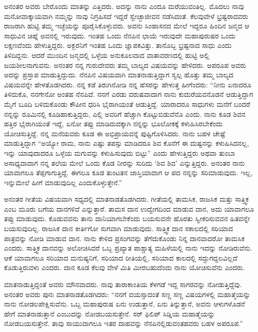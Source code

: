  ಅನಂತರ ಅವರು ಬೇರೊಂದು ಮಾತನ್ನು ಎತ್ತಿದರು. ಅದನ್ನು ನಾನು ಎಂದೂ ಮರೆಯುವಂತಿಲ್ಲ. ಮೊದಲು ನಾವು ಮನೋವಾಕ್ಕಾಯವಾಗಿ ನಮ್ಮನ್ನು ನಾವು ನಿಗ್ರಹಿಸದೆ ಇದ್ದರೆ ಸ್ವೇಚ್ಛಾಜೀವನ ನಡೆಸಿದಂತೆ. ಕೆಲವುವೇಳೆ ಭ್ರಷ್ಟರಾದವರು ರಾಜರಾಗಿ ಹುಟ್ಟಿ ತಮ್ಮ ಇಚ್ಛೆಯನ್ನು ಪೂರೈಸಿಕೊಳ್ಳುವರು. ಅವನು ಸಿಂಹಾಸನದ ಮೇಲೆ ಇದ್ದರೂ ಹಿಂದಿನ ಜನ್ಮದ ಆ ಸಾಧುವಿನ ಚಿಹ್ನೆ ಅವನಲ್ಲಿ ಇರುವುದು. ಇಂತಹ ಒಂದು ನೆನಪಿನ ಛಾಯೆ ಇರುವುದೇ ಮಹಾಪುರುಷರ ಒಂದು ಲಕ್ಷಣವೆಂದು ಹೇಳುತ್ತಿದ್ದರು. ಅಕ್ಬರನಿಗೆ ಇಂತಹ ಒಂದು ಜ್ಞಾಪಕವಿತ್ತು. ತಾನೊಬ್ಬ ಭ್ರಷ್ಟನಾದ ಸಾಧು ಎಂದು ತಿಳಿದಿದ್ದನು. ಆದರೆ ಮುಂದಿನ ಜನ್ಮದಲ್ಲಿ ಒಳ್ಳೆಯ ಅನುಕೂಲವಾದ ವಾತಾವರಣದಲ್ಲಿ ಹುಟ್ಟಿ ಅಲ್ಲಿ ಜಯಶೀಲನಾಗುವನು. ಅನಂತರ ನನ್ನ ಗುರುದೇವರು ತಮ್ಮ ಬಾಲ್ಯದ ವಿಷಯವನ್ನು ಹೇಳಿದರು. ಅಪರೂಪ ಅವರು ಅದನ್ನು ಪ್ರಸ್ತಾಪ ಮಾಡುತ್ತಿದ್ದುದು. ನೆನಪಿನ ವಿಷಯವಾಗಿ ಮಾತನಾಡುತ್ತಿದ್ದಾಗ ಸ್ವಲ್ಪ ಹೊತ್ತು ತಮ್ಮ ಬಾಲ್ಯದ ವಿಷಯವನ್ನೇ ಹೇಳತೊಡಗಿದರು. ನನ್ನ ಕಡೆ ತಿರುಗಿನೋಡಿ ನನ್ನ ಹೆಸರನ್ನು ಹೇಳುತ್ತ ಹೀಗೆಂದರು: “ನೀನು ಏನಾದರೂ ತಿಳಿದುಕೊ, ನನಗೇನೋ ಅಂತಹ ನೆನಪಿದೆ. ನನಗೆ ಎರಡು ವರುಷವಾದಾಗ ನಾನು ಕುದುರೆಯವನೊಡನೆ ಆಡುತ್ತಿದ್ದಾಗ ಮೈಗೆ ಬೂದಿ ಬಳಿದುಕೊಂಡು ಕೌಪೀನ ಧರಿಸಿ ಭೈರಾಗಿಯಂತೆ ಆಡುತ್ತಿದ್ದೆ. ಯಾರಾದರೂ ಸಾಧುಗಳು ಮನೆಗೆ ಬಂದರೆ ನನ್ನನ್ನು ರೂಮಿನಲ್ಲಿ ಕೂಡಿಹಾಕುತ್ತಿದ್ದರು, ಎಲ್ಲಿ ಅವರಿಗೆ ಹೆಚ್ಚಾಗಿ ಕೊಟ್ಟುಬಿಡುವೆನೊ ಎಂದು. ನಾನು ಕೂಡ ಶಿವನ ಹತ್ತಿರ ಭೈರಾಗಿಯಂತೆ ಇದ್ದೆ, ಏನೋ ತಪ್ಪು ಮಾಡಿದುದಕ್ಕಾಗಿ ನನ್ನನ್ನು ಭೂಲೋಕಕ್ಕೆ ಕಳುಹಿಸಿರಬೇಕೆಂದು ಯೋಚಿಸುತ್ತಿದ್ದೆ. ನನ್ನ ಮನೆಯವರು ಕೂಡ ಈ ಅಭಿಪ್ರಾಯವನ್ನೆ ಪುಷ್ಟಿಗೊಳಿಸಿದರು. ನಾನು ಬಹಳ ಚೇಷ್ಟೆ ಮಾಡುತ್ತಿದ್ದಾಗ “ಅಯ್ಯೋ ರಾಮ, ನಾನು ಎಷ್ಟು ತಪಸ್ಸು ಮಾಡಿದರೂ ಶಿವ ಕೊನೆಗೆ ಈ ದುಷ್ಟನನ್ನು ಕಳುಹಿಸಿದನಲ್ಲ, ಇನ್ನು ಯಾವುದಾದರೂ ಒಳ್ಳೆಯ ಮಗುವನ್ನು ಕಳುಹಿಸುವುದು ಬಿಟ್ಟು” ಎಂದು ಹೇಳುತ್ತಿದ್ದರು ಅಥವಾ ತುಂಬಾ ಅಸಾಧ್ಯವಾದಾಗ ನನ್ನ ತಲೆಯ ಮೇಲೆ ಒಂದು ಕೊಡ ನೀರನ್ನು ಸುರಿದು ‘ಶಿವ ಶಿವ’ ಎನ್ನುತ್ತಿದ್ದರು. ಅನಂತರ ನಾನು ಯಾವಾಗಲೂ ತೆಪ್ಪಗಾಗುತ್ತಿದ್ದೆ. ಈಗಲೂ ಕೂಡ ತುಂಟತನ ಜಾಸ್ತಿಯಾದಾಗ ಆ ಪದ ನನ್ನನ್ನು ಸರಿಮಾಡುವುದು. ಇಲ್ಲ, ಇನ್ನುಮೇಲೆ ಹೀಗೆ ಮಾಡುವುದಿಲ್ಲ ಎಂದುಕೊಳ್ಳುತ್ತೇನೆ.” 

 ಅನಂತರ ಗೀತೆಯ ವಿಷಯವಾಗಿ ಸಧ್ಯದಲ್ಲಿ ಮಾತನಾಡತೊಡಗಿದರು. ಗೀತೆಯಲ್ಲಿ ತಾಮಸಿಕ, ರಾಜಸಿಕ ಮತ್ತು ಸಾತ್ತ್ವಿಕ ಎಂಬ ಮೂರು ಬಗೆಯ ದಾನಗಳಿವೆ ಎನ್ನುತ್ತಾರೆ. ತಾಮಸ ದಾನ ಉದ್ವೇಗದಿಂದ ಮಾಡುವ ದಾನ, ಅದು ಯಾವಾಗಲೂ ತಪ್ಪು ಮಾಡುವುದು. ಕೊಡುವವನು ತಾನು ದಾನಿಯಾಗಬೇಕೆಂದು ಬಯಸುವನೇ ಹೊರತು ಸ್ವೀಕರಿಸುವವನ ಹಿತವನ್ನೇ ಬಯಸುವುದಿಲ್ಲ. ರಾಜಸಿಕ ದಾನ ಕೀರ್ತಿಗೋ ಸುಗವಾಗಿ ಮಾಡುವುದು. ಸಾತ್ತ್ವಿಕ ದಾನ ಸಕಾಲದಲ್ಲಿ ಸರಿಯಾದ ಪಾತ್ರವನ್ನು ನೋಡಿ ಮಾಡುವ ದಾನ. ನಾನು ಕೇಳಿದ ಪ್ರಸಂಗವನ್ನು ತೆಗೆದುಕೊಂಡು ನಿನ್ನ ದಾನವಾದರೋ ತಾಮಸಿಕ ಎಂದರು. ಸಾತ್ತ್ವಿಕ ದಾನವನ್ನು ಅಲೋಚಿಸಿದರೆ ಒಬ್ಬ ಪ್ರಖ್ಯಾತ ಪಾಶ್ಚಾತ್ಯ ಮಹಿಳೆಯಲ್ಲಿ ನಾನು ಇದನ್ನು ನೋಡಿರುವೆನು. ಆಕೆ ಯಾವಾಗಲೂ ಸರಿಯಾದ ಮನುಷ್ಯನಿಗೆ, ಸರಿಯಾದ ರೀತಿಯಲ್ಲಿ, ಸರಿಯಾದ ಕಾಲದಲ್ಲಿ ಸದ್ದುಗದ್ದಲವಿಲ್ಲದೆ ಕೊಡುತ್ತಿರುವಳು ಎಂದರು. ದಾನ ಕೂಡ ಕೆಲವು ವೇಳೆ ಮಿತಿ ಮೀರಬಹುದೆಂದು ನಾನು ಯೋಚಿಸುವೆನು ಎಂದರು. 

 ಮಾತನಾಡುತ್ತಿದ್ದಂತೆ ಅವರು ಮೌನವಾದರು. ನಾವು ತಾರಾಕಾಂತಿಯ ಕೆಳಗಡೆ ಇದ್ದ ಸಾಗರವನ್ನು ನೋಡುತ್ತಿದ್ದೆವು. ಅನಂತರ ಅವರು ಪುನಃ ಮಾತನಾಡತೊಡಗಿದರು: “ನನಗೆ ವಯಸ್ಸಾದಂತೆ ಸಣ್ಣ ಸಣ್ಣ ವಿಷಯಗಳಲ್ಲಿ ಮಹಾತ್ಮೆಯನ್ನು ನಾನು ನೋಡಲಪೇಕ್ಷಿಸುವೆನು. ಒಬ್ಬ ಮಹಾಪುರುಷ ಏನು ಉಡುತ್ತಾನೆ, ಏನು ತಿನ್ನುತ್ತಾನೆ, ಅವನು ಆಳುಗಳೊಡನೆ ಹೇಗೆ ಮಾತನಾಡುತ್ತಾನೆ ಎಂಬುದನ್ನು ನೋಡಬಯಸುತ್ತೇನೆ. ಸರ್ ಫಿಲಿಪ್ ಸಿಡ್ನಿಯ ಮಹಾತ್ಮೆಯನ್ನು ನೋಡಬಯಸುತ್ತೇನೆ. ತಾವು ಸಾಯುವಾಗಲೂ ಇತರ ದಾಹವನ್ನು ನೆನಪಿನಲ್ಲಿಡುವಂತಹವರು ಬಹಳ ಅಪರೂಪ.” 


